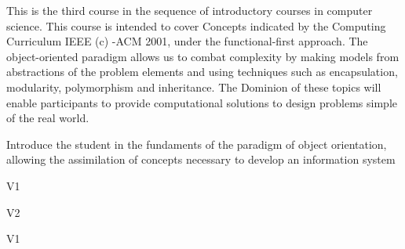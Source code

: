 \begin{syllabus}


\begin{justification}
This is the third course in the sequence of introductory courses in computer science. This course is intended to cover
Concepts indicated by the Computing Curriculum IEEE (c) -ACM 2001, under the functional-first approach.
The object-oriented paradigm allows us to combat complexity by making models from abstractions of the problem elements and using techniques such as encapsulation, modularity, polymorphism and inheritance.
The Dominion  of these topics will enable participants to provide computational solutions to design problems simple of the real world.
\end{justification}

\begin{goals}
\item Introduce the student in the fundaments of the paradigm of object orientation, allowing the assimilation of concepts necessary to develop an information system
\end{goals}

\begin{outcomes}{V1}
    \item {}
    \item {}
    \item {}
\end{outcomes}

\begin{outcomes}{V2}
    \item {}
    \item {}
    \item {}
\end{outcomes}

\begin{competences}{V1}
    \item {} 
    \item {} 
    \item {}
    \item {} 
    \item {}
\end{competences}


\end{syllabus}
